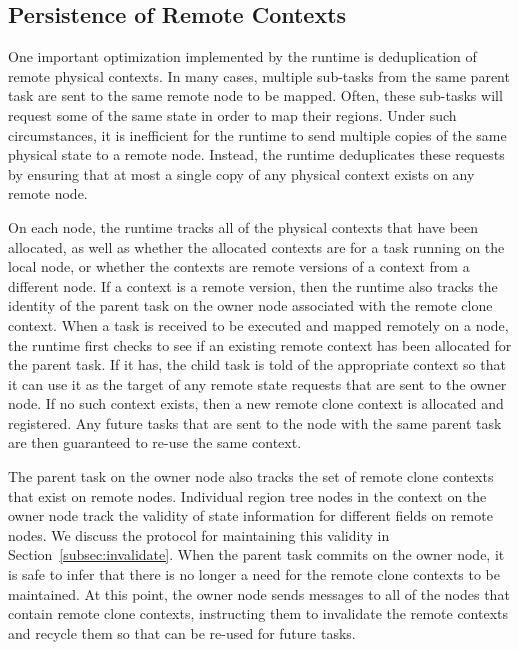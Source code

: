 \subsection{Persistence of Remote Contexts}
\label{subsec:persistence}

One important optimization implemented by the runtime
is deduplication of remote physical contexts. In
many cases, multiple sub-tasks from the same parent
task are sent to the same remote node to be mapped.
Often, these sub-tasks will request some of the same
state in order to map their regions. Under such 
circumstances, it is inefficient for the runtime to
send multiple copies of the same physical state to 
a remote node. Instead, the runtime deduplicates 
these requests by ensuring that at most a single 
copy of any physical context exists on any remote node.

On each node, the runtime tracks all of the physical
contexts that have been allocated, as well as 
whether the allocated contexts are for a task running
on the local node, or whether the contexts are remote 
versions of a context from a different node. If a context
is a remote version, then the runtime also tracks the
identity of the parent task on the owner node associated
with the remote clone context. When a task is
received to be executed and mapped remotely on a 
node, the runtime first checks to see if an existing
remote context has been allocated for the parent 
task. If it has, the child task is told of the appropriate
context so that it can use it as the target of any
remote state requests that are sent to the owner node.
If no such context exists, then a new remote clone
context is allocated and registered.  Any future
tasks that are sent to the node with the same parent
task are then guaranteed to re-use the same context.

The parent task on the owner node also tracks the
set of remote clone contexts that exist on remote nodes.
Individual region tree nodes in the context on the owner
node track the validity of state information for 
different fields on remote nodes. We discuss the
protocol for maintaining this validity in
Section~\ref{subsec:invalidate}. When the parent task
commits on the owner node, it is safe to infer that
there is no longer a need for the remote clone contexts
to be maintained.  At this point, the owner node sends
messages to all of the nodes that contain remote clone
contexts, instructing them to invalidate the remote contexts
and recycle them so that can be re-used for future tasks.

